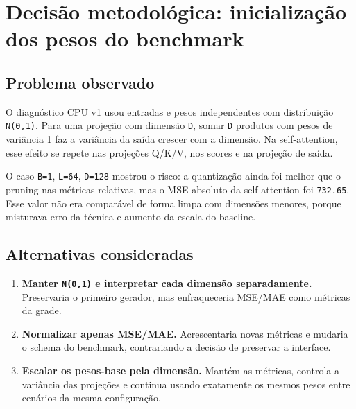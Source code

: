 

\chapter{Decisão metodológica: inicialização dos pesos do benchmark}



\section{Problema observado}






O diagnóstico CPU v1 usou entradas e pesos independentes com distribuição \texttt{N(0,1)}. Para uma projeção com dimensão \texttt{D}, somar \texttt{D} produtos com pesos de variância 1 faz a variância da saída crescer com a dimensão. Na self-attention, esse efeito se repete nas projeções Q/K/V, nos scores e na projeção de saída.






O caso \texttt{B=1}, \texttt{L=64}, \texttt{D=128} mostrou o risco: a quantização ainda foi melhor que o pruning nas métricas relativas, mas o MSE absoluto da self-attention foi \texttt{732.\allowbreak{}65}. Esse valor não era comparável de forma limpa com dimensões menores, porque misturava erro da técnica e aumento da escala do baseline.



\section{Alternativas consideradas}


\begin{enumerate}
\item \textbf{Manter \texttt{N(0,1)} e interpretar cada dimensão separadamente.} Preservaria o
primeiro gerador, mas enfraqueceria MSE/MAE como métricas da grade.
\item \textbf{Normalizar apenas MSE/MAE.} Acrescentaria novas métricas e mudaria o schema
do benchmark, contrariando a decisão de preservar a interface.
\item \textbf{Escalar os pesos-base pela dimensão.} Mantém as métricas, controla a
variância das projeções e continua usando exatamente os mesmos pesos entre
cenários da mesma configuração.
\end{enumerate}



